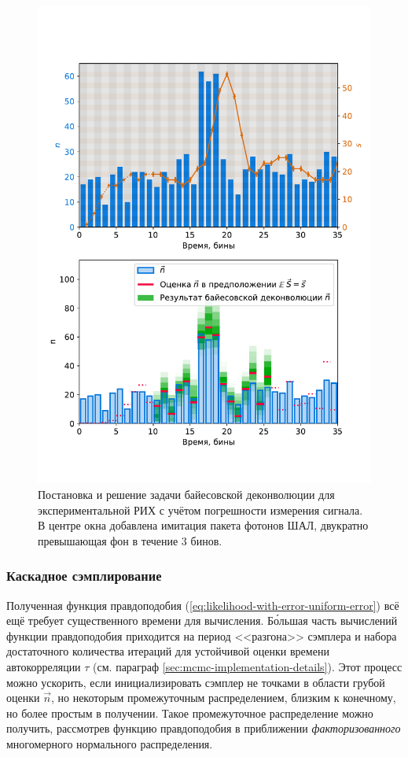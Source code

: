 \documentclass[12pt]{book}
\begin{document}
	\begin{figure}
		\centering
		\includegraphics[width=\columnwidth]{final-problem-and-solution}
		\caption{Постановка и решение задачи байесовской деконволюции для экспериментальной РИХ с учётом погрешности измерения сигнала. В центре окна добавлена имитация пакета фотонов ШАЛ, двукратно превышающая фон в течение 3 бинов.}
		\label{pic:bayesian-deconvolution-with-experimantal-rir-and-rounding}
	\end{figure}

	\subsubsection{Каскадное сэмплирование}
	
	Полученная функция правдоподобия (\ref{eq:likelihood-with-error-uniform-error}) всё ещё требует существенного времени для вычисления. Б\'{о}льшая часть вычислений функции правдоподобия приходится на период <<разгона>> сэмплера и набора достаточного количества итераций для устойчивой оценки времени автокорреляции $\tau$ (см. параграф \ref{sec:mcmc-implementation-details}). Этот процесс можно ускорить, если инициализировать сэмплер не точками в области грубой оценки $\vec{n}$, но некоторым промежуточным распределением, близким к конечному, но более простым в получении. Такое промежуточное распределение можно получить, рассмотрев функцию правдоподобия в приближении \textit{факторизованного} многомерного нормального распределения.
	
\end{document}
